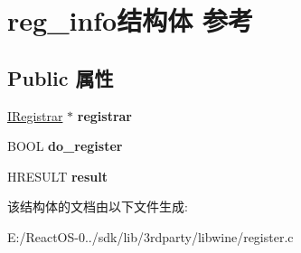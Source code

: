 \hypertarget{structreg__info}{}\section{reg\+\_\+info结构体 参考}
\label{structreg__info}
\subsection*{Public 属性}
\begin{DoxyCompactItemize}
\item 
\mbox{\label{structreg__info_af39a70a24ff8909695e91735211feb5b}} 
\hyperlink{interface_i_registrar}{I\+Registrar} $\ast$ {\bfseries registrar}
\item 
\mbox{\label{structreg__info_a9f5bd9c826b0ef036c0421dfe8d761cb}} 
B\+O\+OL {\bfseries do\+\_\+register}
\item 
\mbox{\label{structreg__info_af19527cf7c6ca4c0977792031939f6f4}} 
H\+R\+E\+S\+U\+LT {\bfseries result}
\end{DoxyCompactItemize}


该结构体的文档由以下文件生成\+:\begin{DoxyCompactItemize}
\item 
E\+:/\+React\+O\+S-\/0../sdk/lib/3rdparty/libwine/register.\+c\end{DoxyCompactItemize}
